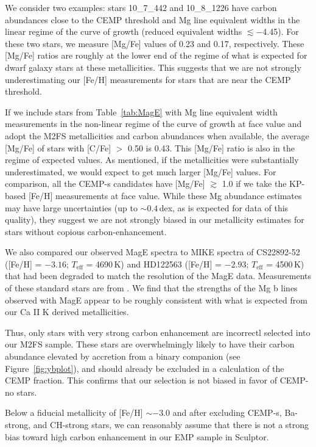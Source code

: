 \documentclass{emulateapj-rtx4}
\begin{document}
We consider two examples: stars 10\_7\_442 and 10\_8\_1226 have carbon abundances close to the CEMP threshold and Mg line equivalent widths in the linear regime of the curve of growth (reduced equivalent widths $\lesssim -$4.45). 
For these two stars, we measure [Mg/Fe] values of 0.23 and 0.17, respectively. 
These [Mg/Fe] ratios are roughly at the lower end of the regime of what is expected for dwarf galaxy stars at these metallicities. 
This suggests that we are not strongly underestimating our [Fe/H] measurements for stars that are near the CEMP threshold.

If we include stars from Table~\ref{tab:MagE} with Mg line equivalent width measurements in the non-linear regime of the curve of growth at face value and adopt the M2FS metallicities and carbon abundances when available, the average [Mg/Fe] of stars with [C/Fe] $>$ 0.50 is 0.43. 
This [Mg/Fe] ratio is also in the regime of expected values. 
As mentioned, if the metallicities were substantially underestimated, we would expect to get much larger [Mg/Fe] values. 
For comparison, all the CEMP-s candidates have [Mg/Fe] $\gtrsim$ 1.0 if we take the KP-based [Fe/H] measurements at face value.
While these Mg abundance estimates may have large uncertainties (up to $\sim0.4$\,dex, as is expected for data of this quality), they suggest we are not strongly biased in our metallicity estimates for stars without copious carbon-enhancement.

We also compared our observed MagE spectra to MIKE spectra of CS22892-52 ([Fe/H] = $-3.16$; $T_{\text{eff}}$ = 4690\,K) and HD122563 ([Fe/H] = $-2.93$; $T_{\text{eff}}$ = 4500\,K) that had been degraded to match the resolution of the MagE data.
Measurements of these standard stars are from \citet{rpt+14}.
We find that the strengths of the Mg b lines observed with MagE appear to be roughly consistent with what is expected from our Ca II K derived metallicities.  

Thus, only stars with very strong carbon enhancement are incorrectl selected into our M2FS sample. 
These stars are overwhelmingly likely to have their carbon abundance elevated by accretion from a binary companion (see Figure~\ref{fig:ybplot}), and should already be excluded in a calculation of the CEMP fraction.
This confirms that our selection is not biased in favor of CEMP-no stars.

Below a fiducial metallicity of [Fe/H] $\sim -3.0$ and after excluding CEMP-s, Ba-strong, and CH-strong stars, we can reasonably assume that there is not a strong bias toward high carbon enhancement in our EMP sample in Sculptor.
\end{document}

